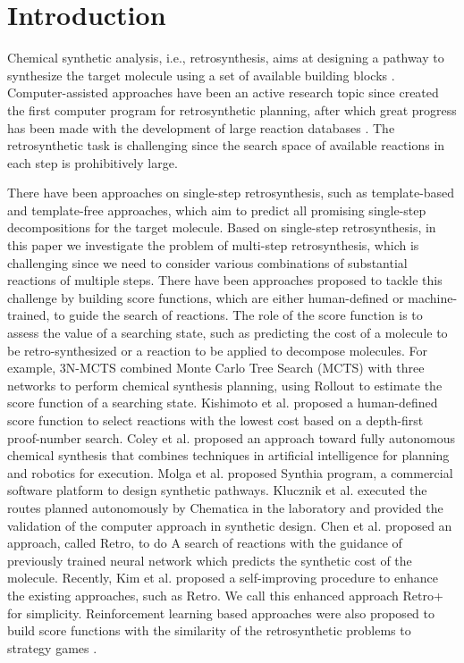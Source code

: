\documentclass[sn-mathphys,Numbered]{sn-jnl}
\begin{document}
\section{Introduction}\label{sec1}

Chemical synthetic analysis, i.e., retrosynthesis, aims at designing a pathway to synthesize the target molecule using a set of available building blocks \cite{corey1991}.
Computer-assisted approaches have been an active research topic since \citeauthor{corey1969} \cite{corey1969} created the first computer program for retrosynthetic planning, after which great progress \cite{segler2017,segler2018, schreck2019, DFPN-E2019, retro2020, Gottipati2020, RL2,2022} has been made with the development of large reaction databases \cite{lowe2017}. The retrosynthetic task is challenging since the search space of available reactions in each step is prohibitively large. 

There have been approaches on single-step retrosynthesis, such as template-based \cite{Coley2017, Dai2019,Coley2019} and template-free \cite{ Liu2017, Zheng2020, Somnath2020,Yan2020, Template-free,NIL-nature} approaches, which aim to predict all promising single-step decompositions for the target molecule. Based on single-step retrosynthesis, in this paper we investigate the problem of multi-step retrosynthesis, which is challenging since we need to consider various combinations of substantial reactions of multiple steps.
There have been approaches proposed to tackle this challenge by building score functions, which are either human-defined or machine-trained, to guide the search of reactions. 
The role of the score function is to assess the value of a searching state, such as predicting the cost of a molecule to be retro-synthesized or a reaction to be applied to decompose molecules. For example, 3N-MCTS \cite{segler2018} combined Monte Carlo Tree Search (MCTS) with three networks to perform chemical synthesis planning, using Rollout to estimate the score function of a searching state.
Kishimoto et al. \cite{DFPN-E2019} proposed a human-defined score function to select reactions with the lowest cost based on a depth-first proof-number search. 
Coley et al. \cite{science-robot} proposed an approach toward fully autonomous chemical synthesis that combines techniques in artificial intelligence for planning and robotics for execution.
Molga et al. \cite{Chematica} proposed Synthia program, a commercial software platform to design synthetic pathways.
Klucznik et al. \cite{Chematica2} executed the routes planned autonomously by Chematica in the laboratory and provided the validation of the computer approach in synthetic design.
Chen et al.\cite{retro2020} proposed an approach, called Retro, to do A search of reactions with the guidance of previously trained neural network which predicts the synthetic cost of the molecule.
Recently, Kim et al. \cite{2022} proposed a self-improving procedure to enhance the existing approaches, such as Retro. We call this enhanced approach Retro+ for simplicity.
Reinforcement learning based approaches \citep{ schreck2019, RL2} were also proposed to build score functions with the similarity of the retrosynthetic problems to strategy games \citep{endofbegin}. 
\end{document}
